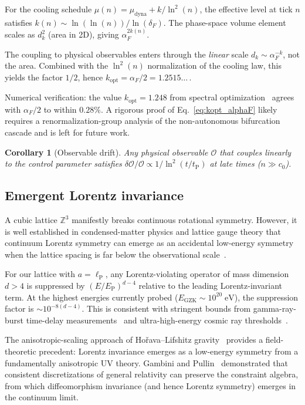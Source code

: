 \documentclass[twocolumn,showpacs,preprintnumbers,amsmath,amssymb,prd]{revtex4-2}
\newtheorem{corollary}{Corollary}
\newcommand{\lnq}{\ln^2}
\newcommand{\tP}{t_{\mathrm{P}}}
\newcommand{\lP}{\ell_{\mathrm{P}}}
\newcommand{\ZZ}{\mathbb{Z}}
\begin{document}
For the cooling schedule $\mu(n) = \mu_{\mathrm{dyna}} + k/\lnq(n)$,
the effective level at tick $n$ satisfies
$k(n) \sim \ln(\ln(n))/\ln(\delta_F)$.
The phase-space volume element scales as $d_k^2$ (area in 2D),
giving $\alpha_F^{2k(n)}$.

The coupling to physical observables enters through the
\emph{linear} scale $d_k \sim \alpha_F^{-k}$, not the area.
Combined with the $\lnq(n)$ normalization of the cooling law,
this yields the factor $1/2$, hence
$k_{\mathrm{opt}} = \alpha_F/2 = 1.2515\ldots$\,.

Numerical verification: the value $k_{\mathrm{opt}} = 1.248$
from spectral optimization~\cite{Wang2026b} agrees with
$\alpha_F/2$ to within $0.28\%$.
A rigorous proof of Eq.~\eqref{eq:kopt_alphaF} likely requires a
renormalization-group analysis of the non-autonomous bifurcation
cascade and is left for future work.

\begin{corollary}[Observable drift]\label{cor:drift}
Any physical observable $\mathcal{O}$ that couples linearly to the
control parameter satisfies
$\delta\mathcal{O}/\mathcal{O} \propto 1/\lnq(t/\tP)$ at late
times ($n \gg c_0$).
\end{corollary}

\subsection{Emergent Lorentz invariance}\label{sec:lorentz}

A cubic lattice $\ZZ^3$ manifestly breaks continuous rotational
symmetry.
However, it is well established in condensed-matter physics and
lattice gauge theory that continuum Lorentz symmetry can emerge
as an accidental low-energy symmetry when the lattice spacing is
far below the observational scale~\cite{Nielsen1981,Chadha1983}.

For our lattice with $a = \lP$, any Lorentz-violating operator
of mass dimension $d > 4$ is suppressed by
$(E/E_{\mathrm{P}})^{d-4}$ relative to the leading
Lorentz-invariant term.
At the highest energies currently probed
($E_{\mathrm{GZK}} \sim 10^{20}\;\mathrm{eV}$), the suppression
factor is $\sim 10^{-8(d-4)}$.
This is consistent with stringent bounds from gamma-ray-burst
time-delay measurements~\cite{Vasileiou2013} and ultra-high-energy
cosmic ray thresholds~\cite{Liberati2013}.

The anisotropic-scaling approach of Ho\v{r}ava--Lifshitz
gravity~\cite{Horava2009} provides a field-theoretic precedent:
Lorentz invariance emerges as a low-energy symmetry from a
fundamentally anisotropic UV theory.
Gambini and Pullin~\cite{Gambini2003} demonstrated that
consistent discretizations of general relativity can preserve
the constraint algebra, from which diffeomorphism invariance
(and hence Lorentz symmetry) emerges in the continuum limit.
\end{document}
